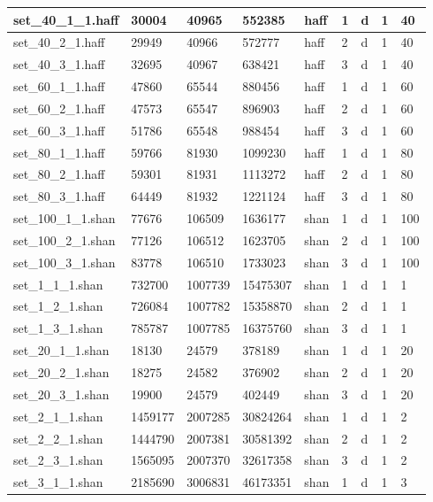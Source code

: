 \documentclass[russian, a4paper, 12pt]{article}
\begin{document}
\begin{tabular}{ | l | l | l | l | l | l | l | l | l | }
	set\_40\_1\_1.haff & 30004 & 40965 & 552385 & haff & 1 & d & 1 & 40 \\ \hline
	set\_40\_2\_1.haff & 29949 & 40966 & 572777 & haff & 2 & d & 1 & 40 \\ \hline
	set\_40\_3\_1.haff & 32695 & 40967 & 638421 & haff & 3 & d & 1 & 40 \\ \hline
	set\_60\_1\_1.haff & 47860 & 65544 & 880456 & haff & 1 & d & 1 & 60 \\ \hline
	set\_60\_2\_1.haff & 47573 & 65547 & 896903 & haff & 2 & d & 1 & 60 \\ \hline
	set\_60\_3\_1.haff & 51786 & 65548 & 988454 & haff & 3 & d & 1 & 60 \\ \hline
	set\_80\_1\_1.haff & 59766 & 81930 & 1099230 & haff & 1 & d & 1 & 80 \\ \hline
	set\_80\_2\_1.haff & 59301 & 81931 & 1113272 & haff & 2 & d & 1 & 80 \\ \hline
	set\_80\_3\_1.haff & 64449 & 81932 & 1221124 & haff & 3 & d & 1 & 80 \\ \hline
	set\_100\_1\_1.shan & 77676 & 106509 & 1636177 & shan & 1 & d & 1 & 100 \\ \hline
	set\_100\_2\_1.shan & 77126 & 106512 & 1623705 & shan & 2 & d & 1 & 100 \\ \hline
	set\_100\_3\_1.shan & 83778 & 106510 & 1733023 & shan & 3 & d & 1 & 100 \\ \hline
	set\_1\_1\_1.shan & 732700 & 1007739 & 15475307 & shan & 1 & d & 1 & 1 \\ \hline
	set\_1\_2\_1.shan & 726084 & 1007782 & 15358870 & shan & 2 & d & 1 & 1 \\ \hline
	set\_1\_3\_1.shan & 785787 & 1007785 & 16375760 & shan & 3 & d & 1 & 1 \\ \hline
	set\_20\_1\_1.shan & 18130 & 24579 & 378189 & shan & 1 & d & 1 & 20 \\ \hline
	set\_20\_2\_1.shan & 18275 & 24582 & 376902 & shan & 2 & d & 1 & 20 \\ \hline
	set\_20\_3\_1.shan & 19900 & 24579 & 402449 & shan & 3 & d & 1 & 20 \\ \hline
	set\_2\_1\_1.shan & 1459177 & 2007285 & 30824264 & shan & 1 & d & 1 & 2 \\ \hline
	set\_2\_2\_1.shan & 1444790 & 2007381 & 30581392 & shan & 2 & d & 1 & 2 \\ \hline
	set\_2\_3\_1.shan & 1565095 & 2007370 & 32617358 & shan & 3 & d & 1 & 2 \\ \hline
	set\_3\_1\_1.shan & 2185690 & 3006831 & 46173351 & shan & 1 & d & 1 & 3 \\ \hline

\end{tabular}
\end{document}
